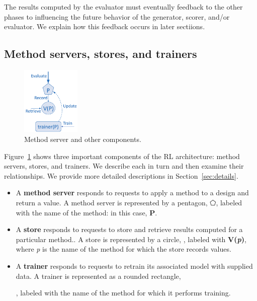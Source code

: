 \documentclass[10pt]{article}
\begin{document}
The results computed by the evaluator must eventually feedback to the other phases to influencing the future behavior of the generator, scorer, and/or evaluator. 
We explain how this feedback occurs in later sectiions.


\subsection{Method servers, stores, and trainers}


\begin{figure}
\vspace{-2ex}
  \centering
  \includegraphics[width=0.25\textwidth,trim=0in 0in 0in 0in,clip]{./Figs/servers.png}
  \vspace{-4ex}
  \caption{Method server and other components.
\label{fig:server}}
\end{figure}

Figure~\ref{fig:server} shows three important components of the RL architecture: method servers, stores, and trainers. We describe each in turn and then examine their relationships.
We provide more detailed descriptions in Section~\ref{sec:details}.
\begin{itemize}
\itemsep-0.3em 
\item
A \textbf{method server} responds to requests to apply a method to a design and return a value. 
A method server is represented by a pentagon, $\pentagon$, labeled with the name of the method: in this case, \textbf{P}. 
\item
A \textbf{store} responds to requests to store and retrieve results computed for a particular method..
A store is represented by a circle, \textbigcircle,
labeled with \textbf{V(\emph{p})}, where \emph{p} is the name of the method for which the store records values.
\item
A \textbf{trainer} responds to requests to retrain its associated model with supplied data.
A trainer is represented as a rounded rectangle, , labeled with the name of the method for which it performs training.
\end{itemize}
\end{document}
